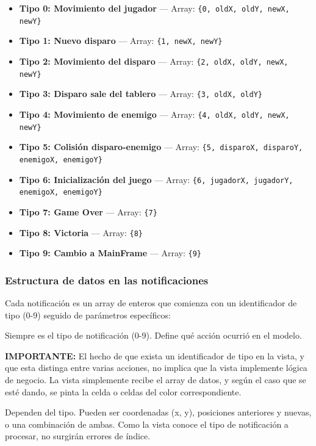 \documentclass[12pt, a4paper]{article}
\begin{document}
\begin{itemize}[leftmargin=2em]
    \item \textbf{Tipo 0: Movimiento del jugador} — Array: \lstinline|{0, oldX, oldY, newX, newY}|
    \item \textbf{Tipo 1: Nuevo disparo} — Array: \lstinline|{1, newX, newY}|
    \item \textbf{Tipo 2: Movimiento del disparo} — Array: \lstinline|{2, oldX, oldY, newX, newY}|
    \item \textbf{Tipo 3: Disparo sale del tablero} — Array: \lstinline|{3, oldX, oldY}|
    \item \textbf{Tipo 4: Movimiento de enemigo} — Array: \lstinline|{4, oldX, oldY, newX, newY}|
    \item \textbf{Tipo 5: Colisión disparo-enemigo} — Array: \lstinline|{5, disparoX, disparoY, enemigoX, enemigoY}|
    \item \textbf{Tipo 6: Inicialización del juego} — Array: \lstinline|{6, jugadorX, jugadorY, enemigoX, enemigoY}|
    \item \textbf{Tipo 7: Game Over} — Array: \lstinline|{7}|
    \item \textbf{Tipo 8: Victoria} — Array: \lstinline|{8}|
    \item \textbf{Tipo 9: Cambio a MainFrame} — Array: \lstinline|{9}|
\end{itemize}

\subsubsection{Estructura de datos en las notificaciones}

Cada notificación es un array de enteros que comienza con un identificador de tipo (0-9) seguido de parámetros específicos:


\begin{description}[leftmargin=2em, style=nextline]
    \item[\textbf{Primer elemento (índice 0)}]
        Siempre es el tipo de notificación (0-9). Define qué acción ocurrió en el modelo.
        
        \textbf{IMPORTANTE:} El hecho de que exista un identificador de tipo en la vista, y que esta distinga entre varias acciones, no implica que la vista implemente lógica de negocio. La vista simplemente recibe el array de datos, y según el caso que se esté dando, se pinta la celda o celdas del color correspondiente.

    \item[\textbf{Elementos posteriores}]
        Dependen del tipo. Pueden ser coordenadas (x, y), posiciones anteriores y nuevas, o una combinación de ambas. 
        Como la vista conoce el tipo de notificación a procesar, no surgirán errores de índice.
\end{description}
\end{document}

